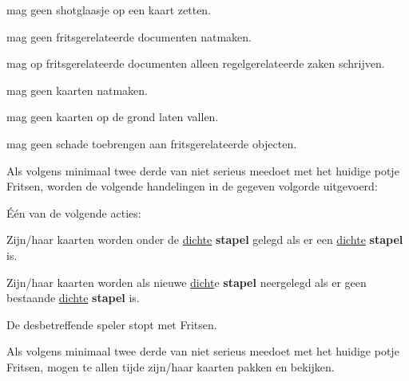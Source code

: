 \vervolgLijst{}
    \item \EenSpeler mag geen shotglaasje op een kaart zetten.
\eindLijst{} 

\vervolgLijst{}
    \item \EenSpeler mag geen fritsgerelateerde documenten natmaken.
\eindLijst{} 

\vervolgLijst{}
    \item \EenSpeler mag op fritsgerelateerde documenten alleen regelgerelateerde zaken schrijven.
\eindLijst{}

\vervolgLijst{}
    \item \EenSpeler mag geen kaarten natmaken.
\eindLijst{}  

\vervolgLijst{}
    \item \EenSpeler mag geen kaarten op de grond laten vallen.
\eindLijst{}  

\vervolgLijst{}
    \item \EenSpeler mag geen schade toebrengen aan fritsgerelateerde objecten. 
\eindLijst{}



\vervolgLijst{}
    \item Als \eenSpeler volgens minimaal twee derde van \alleSpelers niet serieus meedoet met het huidige potje Fritsen, worden de volgende handelingen in de gegeven volgorde uitgevoerd:
    \numeriekeLijst{}
        \item Één van de volgende acties:
        \puntLijst{}
            \item Zijn/haar kaarten worden onder de \ul{dichte} \textbf{stapel} gelegd als er een \ul{dichte} \textbf{stapel} is. 
            \item Zijn/haar kaarten worden als nieuwe \ul{dicht}e \textbf{stapel} neergelegd als er geen bestaande \ul{dichte} \textbf{stapel} is. 
        \eindPuntLijst{}
        \item De desbetreffende speler stopt met Fritsen.
    \eindNumeriekeLijst{}
\eindLijst{}

\vervolgLijst{}
    \item Als \eenSpeler volgens minimaal twee derde van \alleSpelers niet serieus meedoet met het huidige potje Fritsen, mogen \alleSpelers te allen tijde zijn/haar kaarten pakken en bekijken.
\eindLijst{}


